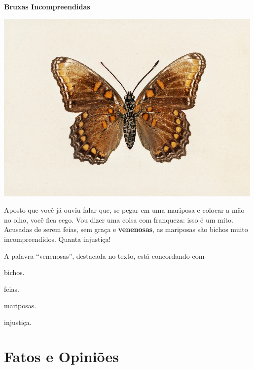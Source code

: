 \begin{myquote}
\textbf{Bruxas Incompreendidas}

\begin{center}
\includegraphics[width=\textwidth]{media/image24c.jpg}
\end{center}

Aposto que você já ouviu falar que, se pegar em uma mariposa e colocar a
mão no olho, você fica cego. Vou dizer uma coisa com franqueza: isso é
um mito. Acusadas de serem feias, sem graça e \textbf{venenosas}, as
mariposas são bichos muito incompreendidos. Quanta injustiça!

\end{myquote}

A palavra ``venenosas'', destacada no texto, está concordando com

\begin{escolha}
\item bichos.

\item feias.

\item mariposas.

\item injustiça.
\end{escolha}

\chapter{Fatos e Opiniões}

